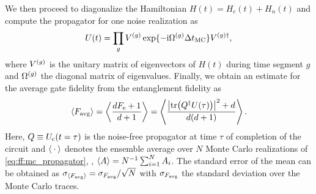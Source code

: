 We then proceed to diagonalize the Hamiltonian $H(t) = H_c(t) + H_n(t)$ and compute the propagator for one noise realization as
\begin{equation}\label{eq:ff:mc_propagator}
U(t) = \prod_g V^{(g)}\exp\lbrace -\mathrm{i}\Omega^{(g)}\Delta t_{\mathrm{MC}}\rbrace V^{(g)\dagger},
\end{equation}
where $V^{(g)}$ is the unitary matrix of eigenvectors of $H(t)$ during time segment $g$ and $\Omega^{(g)}$ the diagonal matrix of eigenvalues.
Finally, we obtain an estimate for the average gate fidelity \avgfid from the entanglement fidelity \entfid as
\begin{equation}
    \ev{\avgfid} = \ev{\frac{d\entfid + 1}{d+1}} = \ev{\frac{\abs{\tr(Q\adjoint U(\tau))}^2 + d}{d(d+1)}}.
\end{equation}
Here, $Q\equiv U_{\mathrm{c}}(t=\tau)$ is the noise-free propagator at time $\tau$ of completion of the circuit and $\ev{\placeholder}$ denotes the ensemble average over $N$ Monte Carlo realizations of \cref{eq:ff:mc_propagator}, \ie, $\ev{A}=N\inverse\sum_{i=1}^N A_i$.
The standard error of the mean can be obtained as $\sigma_{\ev{\avgfid}} = \sigma_{\avgfid} / \sqrt{N}$ with $\sigma_{F_{\mathrm{avg}}}$ the standard deviation over the Monte Carlo traces.
